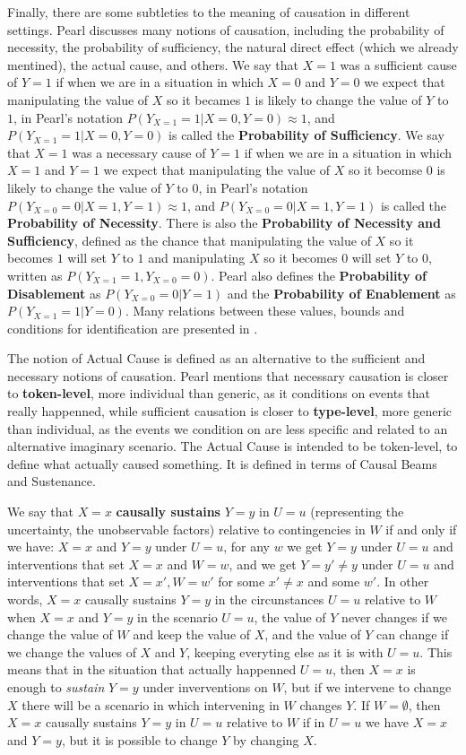 Finally, there are some subtleties to the meaning of causation in different settings. Pearl discusses many notions of causation, including the probability of necessity, the probability of sufficiency, the natural direct effect (which we already mentined), the actual cause, and others. We say that $X=1$ was a sufficient cause of $Y=1$ if when we are in a situation in which $X=0$ and $Y=0$ we expect that manipulating the value of $X$ so it becames $1$ is likely to change the value of $Y$ to $1$, in Pearl's notation $P(Y_{X=1}=1 | X=0, Y=0) \approx 1$, and $P(Y_{X=1}=1 | X=0, Y=0)$ is called the \textbf{Probability of Sufficiency}. We say that $X=1$ was a necessary cause of $Y=1$ if when we are in a situation in which $X=1$ and $Y=1$ we expect that manipulating the value of $X$ so it becomse $0$ is likely to change the value of $Y$ to $0$, in Pearl's notation $P(Y_{X=0}=0 | X = 1, Y = 1) \approx 1$, and $P(Y_{X=0}=0 | X = 1, Y = 1)$ is called the \textbf{Probability of Necessity}. There is also the \textbf{Probability of Necessity and Sufficiency}, defined as the chance that manipulating the value of $X$ so it becomes $1$ will set $Y$ to $1$ and manipulating $X$ so it becomes $0$ will set $Y$ to $0$, written as $P(Y_{X=1}=1,Y_{X=0}=0)$. Pearl also defines the \textbf{Probability of Disablement} as $P(Y_{X=0}=0|Y=1)$ and the \textbf{Probability of Enablement} as $P(Y_{X=1}=1|Y=0)$. Many relations between these values, bounds and conditions for identification are presented in \cite[Chapter~9]{Causality}.

The notion of Actual Cause is defined as an alternative to the sufficient and necessary notions of causation. Pearl mentions that necessary causation is closer to \textbf{token-level}, more individual than generic, as it conditions on events that really happenned, while sufficient causation is closer to \textbf{type-level}, more generic than individual, as the events we condition on are less specific and related to an alternative imaginary scenario. The Actual Cause is intended to be token-level, to define what actually caused something. It is defined in terms of Causal Beams and Sustenance. 

We say that $X=x$ \textbf{causally sustains} $Y=y$ in $U=u$ (representing the uncertainty, the unobservable factors) relative to contingencies in $W$ if and only if we have: $X=x$ and $Y=y$ under $U=u$, for any $w$ we get $Y=y$ under $U=u$ and interventions that set $X=x$ and $W=w$, and we get $Y=y' \neq y$ under $U=u$ and interventions that set $X=x',W=w'$ for some $x' \neq x$ and some $w'$. In other words, $X=x$ causally sustains $Y=y$ in the circunstances $U=u$ relative to $W$ when $X=x$ and $Y=y$ in the scenario $U=u$, the value of $Y$ never changes if we change the value of $W$ and keep the value of $X$, and the value of $Y$ can change if we change the values of $X$ and $Y$, keeping everyting else as it is with $U=u$. This means that in the situation that actually happenned $U=u$, then $X=x$ is enough to \emph{sustain} $Y=y$ under inverventions on $W$, but if we intervene to change $X$ there will be a scenario in which intervening in $W$ changes $Y$. If $W=\emptyset$, then $X=x$ causally sustains $Y=y$ in $U=u$ relative to $W$ if in $U=u$ we have $X=x$ and $Y=y$, but it is possible to change $Y$ by changing $X$.

